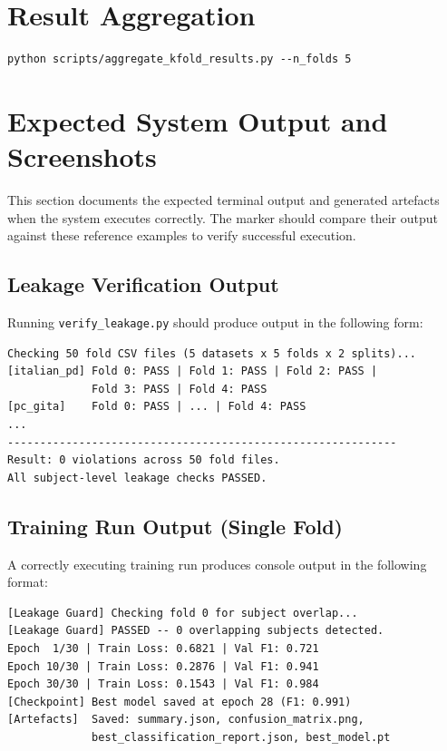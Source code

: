 \documentclass[oneside,openany]{final_report}
\begin{document}
\section{Result Aggregation}
\begin{verbatim}
python scripts/aggregate_kfold_results.py --n_folds 5
\end{verbatim}

\section{Expected System Output and Screenshots}
\label{sec:screenshots}

This section documents the expected terminal output and generated artefacts when the system executes correctly. The marker should compare their output against these reference examples to verify successful execution.

\subsection*{Leakage Verification Output}

Running \texttt{verify\_leakage.py} should produce output in the following form:
\begin{verbatim}
Checking 50 fold CSV files (5 datasets x 5 folds x 2 splits)...
[italian_pd] Fold 0: PASS | Fold 1: PASS | Fold 2: PASS |
             Fold 3: PASS | Fold 4: PASS
[pc_gita]    Fold 0: PASS | ... | Fold 4: PASS
...
------------------------------------------------------------
Result: 0 violations across 50 fold files.
All subject-level leakage checks PASSED.
\end{verbatim}

\subsection*{Training Run Output (Single Fold)}

A correctly executing training run produces console output in the following format:
\begin{verbatim}
[Leakage Guard] Checking fold 0 for subject overlap...
[Leakage Guard] PASSED -- 0 overlapping subjects detected.
Epoch  1/30 | Train Loss: 0.6821 | Val F1: 0.721
Epoch 10/30 | Train Loss: 0.2876 | Val F1: 0.941
Epoch 30/30 | Train Loss: 0.1543 | Val F1: 0.984
[Checkpoint] Best model saved at epoch 28 (F1: 0.991)
[Artefacts]  Saved: summary.json, confusion_matrix.png,
             best_classification_report.json, best_model.pt
\end{verbatim}
\end{document}
